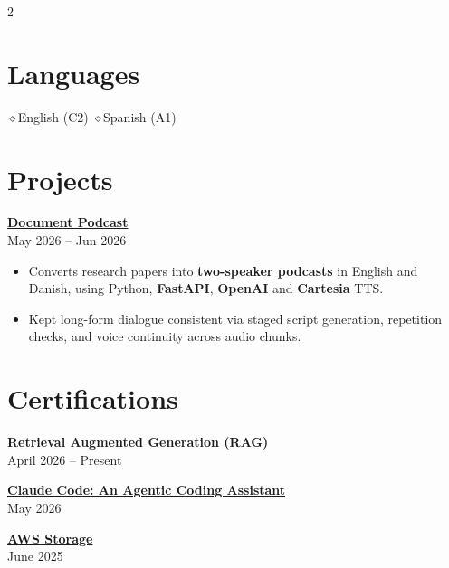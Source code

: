 \documentclass[10pt,a4paper]{article}
\newcommand{\emptydiamond}[0]{\space$\diamond$\space}
\begin{document}
\begin{paracol}{2}
\section{Languages}
{\small \emptydiamond English (C2) \emptydiamond Spanish (A1)}
\vspace{6pt}
\section{Projects}
\textbf{\href{https://document-podcast.onrender.com/}{Document Podcast}}\\
{\footnotesize\color{darkgray} May 2026 – Jun 2026}
\begin{itemize}\sloppy
\item \small Converts research papers into \textbf{two-speaker podcasts} in English and Danish, using Python, \textbf{FastAPI}, \textbf{OpenAI} and \textbf{Cartesia} TTS.
\item \small Kept long-form dialogue consistent via staged script generation, repetition checks, and voice continuity across audio chunks.
\end{itemize}
\vspace{6pt}
\section{Certifications}
\textbf{Retrieval Augmented Generation (RAG)}\\
{\footnotesize\color{darkgray} April 2026 – Present}

\vspace{4pt}
\textbf{\href{https://learn.deeplearning.ai/accomplishments/91da3d54-b8aa-421c-b26a-344e703662da}{Claude Code: An Agentic Coding Assistant}}\\
{\footnotesize\color{darkgray} May 2026}

\vspace{4pt}
\textbf{\href{https://www.coursera.org/account/accomplishments/verify/0CDH2M6QXYVZ}{AWS Storage}}\\
{\footnotesize\color{darkgray} June 2025}
\vspace{6pt}
\switchcolumn
\fontsize{10.4}{12.4}\selectfont%

\end{paracol}
\end{document}

